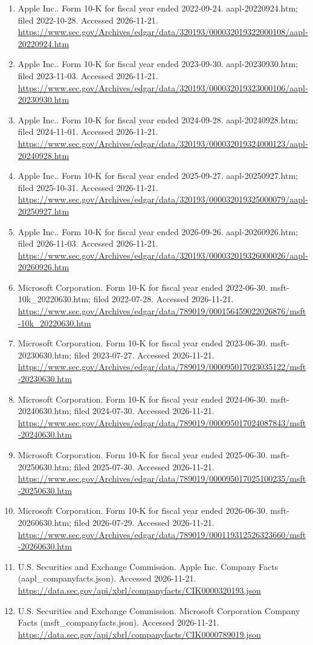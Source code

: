 \documentclass[10pt]{article}
\begin{document}
\newpage
{}\small\begin{enumerate}\item Apple Inc.. Form 10-K for fiscal year ended 2022-09-24. aapl-20220924.htm; filed 2022-10-28. Accessed 2026-11-21. \url{https://www.sec.gov/Archives/edgar/data/320193/000032019322000108/aapl-20220924.htm}
\item Apple Inc.. Form 10-K for fiscal year ended 2023-09-30. aapl-20230930.htm; filed 2023-11-03. Accessed 2026-11-21. \url{https://www.sec.gov/Archives/edgar/data/320193/000032019323000106/aapl-20230930.htm}
\item Apple Inc.. Form 10-K for fiscal year ended 2024-09-28. aapl-20240928.htm; filed 2024-11-01. Accessed 2026-11-21. \url{https://www.sec.gov/Archives/edgar/data/320193/000032019324000123/aapl-20240928.htm}
\item Apple Inc.. Form 10-K for fiscal year ended 2025-09-27. aapl-20250927.htm; filed 2025-10-31. Accessed 2026-11-21. \url{https://www.sec.gov/Archives/edgar/data/320193/000032019325000079/aapl-20250927.htm}
\item Apple Inc.. Form 10-K for fiscal year ended 2026-09-26. aapl-20260926.htm; filed 2026-11-03. Accessed 2026-11-21. \url{https://www.sec.gov/Archives/edgar/data/320193/000032019326000026/aapl-20260926.htm}
\item Microsoft Corporation. Form 10-K for fiscal year ended 2022-06-30. msft-10k_20220630.htm; filed 2022-07-28. Accessed 2026-11-21. \url{https://www.sec.gov/Archives/edgar/data/789019/000156459022026876/msft-10k_20220630.htm}
\item Microsoft Corporation. Form 10-K for fiscal year ended 2023-06-30. msft-20230630.htm; filed 2023-07-27. Accessed 2026-11-21. \url{https://www.sec.gov/Archives/edgar/data/789019/000095017023035122/msft-20230630.htm}
\item Microsoft Corporation. Form 10-K for fiscal year ended 2024-06-30. msft-20240630.htm; filed 2024-07-30. Accessed 2026-11-21. \url{https://www.sec.gov/Archives/edgar/data/789019/000095017024087843/msft-20240630.htm}
\item Microsoft Corporation. Form 10-K for fiscal year ended 2025-06-30. msft-20250630.htm; filed 2025-07-30. Accessed 2026-11-21. \url{https://www.sec.gov/Archives/edgar/data/789019/000095017025100235/msft-20250630.htm}
\item Microsoft Corporation. Form 10-K for fiscal year ended 2026-06-30. msft-20260630.htm; filed 2026-07-29. Accessed 2026-11-21. \url{https://www.sec.gov/Archives/edgar/data/789019/000119312526323660/msft-20260630.htm}
\item U.S. Securities and Exchange Commission. Apple Inc. Company Facts (aapl_companyfacts.json). Accessed 2026-11-21. \url{https://data.sec.gov/api/xbrl/companyfacts/CIK0000320193.json}
\item U.S. Securities and Exchange Commission. Microsoft Corporation Company Facts (msft_companyfacts.json). Accessed 2026-11-21. \url{https://data.sec.gov/api/xbrl/companyfacts/CIK0000789019.json}\end{enumerate}
\end{document}

